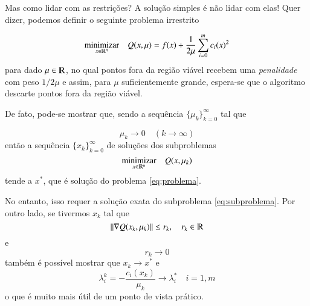 Mas como lidar com as restrições? A solução simples é não lidar com elas! \citep{Friedlander94}
Quer dizer, podemos definir o seguinte problema irrestrito

\begin{equation}
    \label{eq:subproblema}
    \underset{x \in \varmathbb{R}^n}{\text{minimizar}} \quad Q(x, \mu) = f(x) + \frac{1}{2\mu}\sum_{i = 0}^m c_i(x)^2
\end{equation}
para dado $\mu \in \varmathbb{R}$, no qual pontos fora da região viável recebem uma \emph{penalidade} com peso
$1/2\mu$ e assim, para $\mu$ suficientemente grande, espera-se que o algoritmo
descarte pontos fora da região viável.

De fato, pode-se mostrar que, sendo a sequência $\{ \mu_k\}_{k=0}^\infty$ tal que

\begin{equation}
    \mu_k \rightarrow 0 \quad (k \rightarrow \infty)
\end{equation}
então a sequência $\{x_k\}_{k = 0}^\infty$ de soluções dos subproblemas
\begin{equation*}
    \underset{x \in \varmathbb{R}^n}{\text{minimizar}} \quad Q(x, \mu_k)
\end{equation*}
tende a $x^*$, que é solução do problema \ref{eq:problema}.

No entanto, isso requer a solução exata do subproblema \ref{eq:subproblema}.
Por outro lado, se tivermos $x_k$ tal que
\begin{equation*}
    \| \nabla Q(x_k, \mu_k)\| \leq r_k, \quad r_k \in \varmathbb{R}
\end{equation*}
e
$$ r_k \rightarrow 0$$
também é possível mostrar que $x_k \rightarrow x^*$ e
$$ \lambda_i^k = -\frac{c_i(x_k)}{\mu_k} \rightarrow \lambda_i^* \quad i = 1, m$$
o que é muito mais útil
de um ponto de vista prático.
